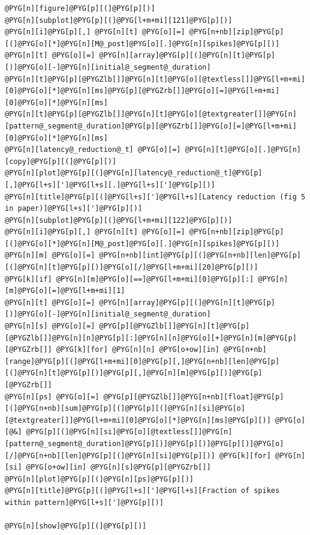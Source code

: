 \documentclass[letterpaper,10pt,english]{manual}
\begin{document}
\begin{Verbatim}[commandchars=@\[\]]
@PYG[n][figure]@PYG[p][(]@PYG[p][)]
@PYG[n][subplot]@PYG[p][(]@PYG[l+m+mi][121]@PYG[p][)]
@PYG[n][i]@PYG[p][,] @PYG[n][t] @PYG[o][=] @PYG[n+nb][zip]@PYG[p][(]@PYG[o][*]@PYG[n][M@_post]@PYG[o][.]@PYG[n][spikes]@PYG[p][)]
@PYG[n][t] @PYG[o][=] @PYG[n][array]@PYG[p][(]@PYG[n][t]@PYG[p][)]@PYG[o][-]@PYG[n][initial@_segment@_duration]
@PYG[n][t]@PYG[p][@PYGZlb[]]@PYG[n][t]@PYG[o][@textless[]]@PYG[l+m+mi][0]@PYG[o][*]@PYG[n][ms]@PYG[p][@PYGZrb[]]@PYG[o][=]@PYG[l+m+mi][0]@PYG[o][*]@PYG[n][ms]
@PYG[n][t]@PYG[p][@PYGZlb[]]@PYG[n][t]@PYG[o][@textgreater[]]@PYG[n][pattern@_segment@_duration]@PYG[p][@PYGZrb[]]@PYG[o][=]@PYG[l+m+mi][0]@PYG[o][*]@PYG[n][ms]
@PYG[n][latency@_reduction@_t] @PYG[o][=] @PYG[n][t]@PYG[o][.]@PYG[n][copy]@PYG[p][(]@PYG[p][)]
@PYG[n][plot]@PYG[p][(]@PYG[n][latency@_reduction@_t]@PYG[p][,]@PYG[l+s][']@PYG[l+s][.]@PYG[l+s][']@PYG[p][)]
@PYG[n][title]@PYG[p][(]@PYG[l+s][']@PYG[l+s][Latency reduction (fig 5 in paper)]@PYG[l+s][']@PYG[p][)]
@PYG[n][subplot]@PYG[p][(]@PYG[l+m+mi][122]@PYG[p][)]
@PYG[n][i]@PYG[p][,] @PYG[n][t] @PYG[o][=] @PYG[n+nb][zip]@PYG[p][(]@PYG[o][*]@PYG[n][M@_post]@PYG[o][.]@PYG[n][spikes]@PYG[p][)]
@PYG[n][m] @PYG[o][=] @PYG[n+nb][int]@PYG[p][(]@PYG[n+nb][len]@PYG[p][(]@PYG[n][t]@PYG[p][)]@PYG[o][/]@PYG[l+m+mi][20]@PYG[p][)]
@PYG[k][if] @PYG[n][m]@PYG[o][==]@PYG[l+m+mi][0]@PYG[p][:] @PYG[n][m]@PYG[o][=]@PYG[l+m+mi][1]
@PYG[n][t] @PYG[o][=] @PYG[n][array]@PYG[p][(]@PYG[n][t]@PYG[p][)]@PYG[o][-]@PYG[n][initial@_segment@_duration]
@PYG[n][s] @PYG[o][=] @PYG[p][@PYGZlb[]]@PYG[n][t]@PYG[p][@PYGZlb[]]@PYG[n][n]@PYG[p][:]@PYG[n][n]@PYG[o][+]@PYG[n][m]@PYG[p][@PYGZrb[]] @PYG[k][for] @PYG[n][n] @PYG[o+ow][in] @PYG[n+nb][range]@PYG[p][(]@PYG[l+m+mi][0]@PYG[p][,]@PYG[n+nb][len]@PYG[p][(]@PYG[n][t]@PYG[p][)]@PYG[p][,]@PYG[n][m]@PYG[p][)]@PYG[p][@PYGZrb[]]
@PYG[n][ps] @PYG[o][=] @PYG[p][@PYGZlb[]]@PYG[n+nb][float]@PYG[p][(]@PYG[n+nb][sum]@PYG[p][(]@PYG[p][(]@PYG[n][si]@PYG[o][@textgreater[]]@PYG[l+m+mi][0]@PYG[o][*]@PYG[n][ms]@PYG[p][)] @PYG[o][@&] @PYG[p][(]@PYG[n][si]@PYG[o][@textless[]]@PYG[n][pattern@_segment@_duration]@PYG[p][)]@PYG[p][)]@PYG[p][)]@PYG[o][/]@PYG[n+nb][len]@PYG[p][(]@PYG[n][si]@PYG[p][)] @PYG[k][for] @PYG[n][si] @PYG[o+ow][in] @PYG[n][s]@PYG[p][@PYGZrb[]]
@PYG[n][plot]@PYG[p][(]@PYG[n][ps]@PYG[p][)]
@PYG[n][title]@PYG[p][(]@PYG[l+s][']@PYG[l+s][Fraction of spikes within pattern]@PYG[l+s][']@PYG[p][)]

@PYG[n][show]@PYG[p][(]@PYG[p][)]
\end{Verbatim}

\resetcurrentobjects
\hypertarget{--doc-examples-frompapers_Rothman_Manis_2003}{}
\end{document}
